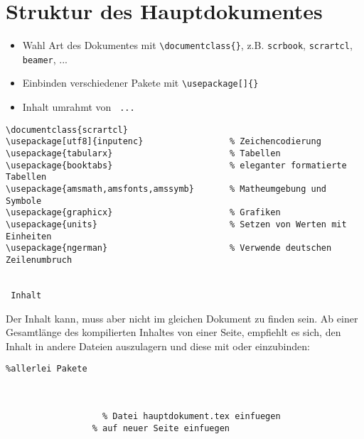 \section{Struktur des Hauptdokumentes}

\begin{itemize}
 \item Wahl Art des Dokumentes mit \lstinline$\documentclass{}$, z.B.
       \lstinline$scrbook$, \lstinline$scrartcl$, \lstinline$beamer$, ...
 \item Einbinden verschiedener Pakete mit \lstinline$\usepackage[]{}$
 \item Inhalt umrahmt von \lstinline$ ... $
\end{itemize}

\begin{lstlisting}
\documentclass{scrartcl}
\usepackage[utf8]{inputenc}                 % Zeichencodierung
\usepackage{tabularx}                       % Tabellen
\usepackage{booktabs}                       % eleganter formatierte Tabellen
\usepackage{amsmath,amsfonts,amssymb}       % Matheumgebung und Symbole
\usepackage{graphicx}                       % Grafiken
\usepackage{units}                          % Setzen von Werten mit Einheiten
\usepackage{ngerman}                        % Verwende deutschen Zeilenumbruch


 Inhalt

\end{lstlisting}

Der Inhalt kann, muss aber nicht im gleichen Dokument zu finden sein. Ab einer
Gesamtlänge des kompilierten Inhaltes von einer Seite, empfiehlt es sich, den Inhalt
in andere Dateien auszulagern und diese mit \lstinline$$ oder
\lstinline$$ einzubinden:

\begin{lstlisting}
%allerlei Pakete



                   % Datei hauptdokument.tex einfuegen
                 % auf neuer Seite einfuegen



\end{lstlisting}
